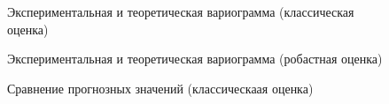 \begin{figure}[H]
\caption{Экспериментальная и теоретическая вариограмма (классическая оценка)}
\label{img:classical-variogram}
\end{figure}

\begin{figure}[H]
\caption{Экспериментальная и теоретическая вариограмма (робастная оценка)}
\label{img:robust-variogram}
\end{figure}

\begin{figure}[H]
\caption{Сравнение прогнозных значений (классическаая оценка)}
\label{img:classical-best-cross-prediction}
\end{figure}

